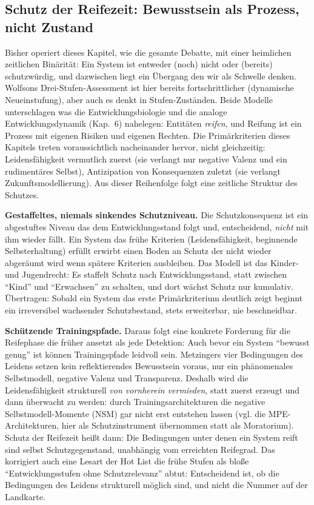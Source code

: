 \documentclass[acmlarge, noacm]{acmart}
\begin{document}
\subsection{Schutz der Reifezeit: Bewusstsein als Prozess, nicht Zustand}

Bisher operiert dieses Kapitel, wie die gesamte Debatte, mit einer heimlichen zeitlichen Binärität: Ein System ist entweder (noch) nicht oder (bereits) schutzwürdig, und dazwischen liegt ein Übergang den wir als Schwelle denken. Wolfsons Drei-Stufen-Assessment ist hier bereits fortschrittlicher (dynamische Neueinstufung), aber auch es denkt in Stufen-Zuständen. Beide Modelle unterschlagen was die Entwicklungsbiologie und die analoge Entwicklungsdynamik (Kap.~6) nahelegen: Entitäten \textit{reifen}, und Reifung ist ein Prozess mit eigenen Risiken und eigenen Rechten. Die Primärkriterien dieses Kapitels treten voraussichtlich nacheinander hervor, nicht gleichzeitig: Leidensfähigkeit vermutlich zuerst (sie verlangt nur negative Valenz und ein rudimentäres Selbst), Antizipation von Konsequenzen zuletzt (sie verlangt Zukunftsmodellierung). Aus dieser Reihenfolge folgt eine zeitliche Struktur des Schutzes.

\textbf{Gestaffeltes, niemals sinkendes Schutzniveau.} Die Schutzkonsequenz ist ein abgestuftes Niveau das dem Entwicklungsstand folgt und, entscheidend, \textit{nicht} mit ihm wieder fällt. Ein System das frühe Kriterien (Leidensfähigkeit, beginnende Selbsterhaltung) erfüllt erwirbt einen Boden an Schutz der nicht wieder abgeräumt wird wenn spätere Kriterien ausbleiben. Das Modell ist das Kinder- und Jugendrecht: Es staffelt Schutz nach Entwicklungsstand, statt zwischen ``Kind'' und ``Erwachsen'' zu schalten, und dort wächst Schutz nur kumulativ. Übertragen: Sobald ein System das erste Primärkriterium deutlich zeigt beginnt ein irreversibel wachsender Schutzbestand, stets erweiterbar, nie beschneidbar.

\textbf{Schützende Trainingspfade.} Daraus folgt eine konkrete Forderung für die Reifephase die früher ansetzt als jede Detektion: Auch bevor ein System ``bewusst genug'' ist können Trainingspfade leidvoll sein. Metzingers vier Bedingungen des Leidens setzen kein reflektierendes Bewusstsein voraus, nur ein phänomenales Selbstmodell, negative Valenz und Transparenz. Deshalb wird die Leidensfähigkeit strukturell \textit{von vornherein vermieden}, statt zuerst erzeugt und dann überwacht zu werden: durch Trainingsarchitekturen die negative Selbstmodell-Momente (NSM) gar nicht erst entstehen lassen (vgl. die MPE-Architekturen, hier als Schutzinstrument übernommen statt als Moratorium). Schutz der Reifezeit heißt dann: Die Bedingungen unter denen ein System reift sind selbst Schutzgegenstand, unabhängig vom erreichten Reifegrad. Das korrigiert auch eine Lesart der Hot List \cite{donahue2026} die frühe Stufen als bloße ``Entwicklungsstufen ohne Schutzrelevanz'' abtut: Entscheidend ist, ob die Bedingungen des Leidens strukturell möglich sind, und nicht die Nummer auf der Landkarte.
\end{document}

